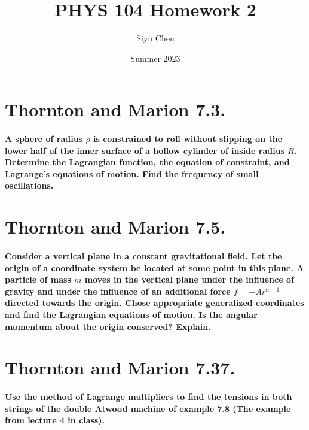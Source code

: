 \documentclass{article}
\title{PHYS 104 Homework 2}
\author{Siyu Chen}
\date{Summer 2023}
\numberwithin{equation}{section}
\begin{document}
\maketitle

\section{Thornton and Marion 7.3.}

\paragraph{A sphere of radius $\rho$ is constrained to roll without slipping on the lower half of the inner surface of a hollow cylinder of inside radius $R$. Determine the Lagrangian function, the equation of constraint, and Lagrange’s equations of motion. Find the frequency of small oscillations. \\}

\section{Thornton and Marion 7.5.}

\paragraph{Consider a vertical plane in a constant gravitational field. Let the origin of a coordinate system be located at some point in this plane. A particle of mass $m$ moves in the vertical plane under the influence of gravity and under the influence of an additional force $f = -A r^{\alpha-1}$ directed towards the origin. Chose appropriate generalized coordinates and find the Lagrangian equations of motion. Is the angular momentum about the origin conserved? Explain. \\}

\section{Thornton and Marion 7.37.}

\paragraph{Use the method of Lagrange multipliers to find the tensions in both strings of the double Atwood machine of example 7.8 (The example from lecture 4 in class). \\}
\end{document}
